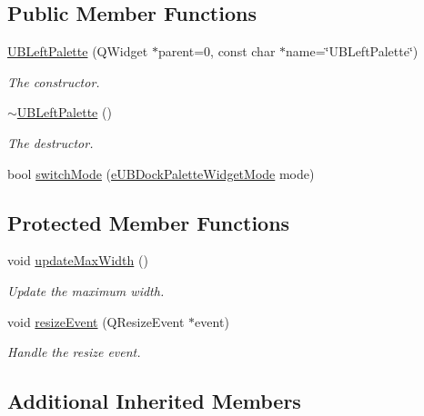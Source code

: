 \subsection*{Public Member Functions}
\begin{DoxyCompactItemize}
\item 
\hyperlink{class_u_b_left_palette_a375fa17ac893f4b30d856fa62b843ff1}{U\-B\-Left\-Palette} (Q\-Widget $\ast$parent=0, const char $\ast$name=\char`\"{}U\-B\-Left\-Palette\char`\"{})
\begin{DoxyCompactList}\small\item\em The constructor. \end{DoxyCompactList}\item 
\hyperlink{class_u_b_left_palette_adcd5e9f5aa5341dce84f5f16448a16ba}{$\sim$\-U\-B\-Left\-Palette} ()
\begin{DoxyCompactList}\small\item\em The destructor. \end{DoxyCompactList}\item 
bool \hyperlink{class_u_b_left_palette_a1390f53120608624d6c33e6144ca4204}{switch\-Mode} (\hyperlink{_u_b_dock_palette_widget_8h_af3b2828ed1bf91ad13c73e4e1b3b529e}{e\-U\-B\-Dock\-Palette\-Widget\-Mode} mode)
\end{DoxyCompactItemize}
\subsection*{Protected Member Functions}
\begin{DoxyCompactItemize}
\item 
void \hyperlink{class_u_b_left_palette_aa29a345c379c79a6a4862c45fac018ec}{update\-Max\-Width} ()
\begin{DoxyCompactList}\small\item\em Update the maximum width. \end{DoxyCompactList}\item 
void \hyperlink{class_u_b_left_palette_a43e1b4228ad821e4c0b1c261086e36b7}{resize\-Event} (Q\-Resize\-Event $\ast$event)
\begin{DoxyCompactList}\small\item\em Handle the resize event. \end{DoxyCompactList}\end{DoxyCompactItemize}
\subsection*{Additional Inherited Members}


